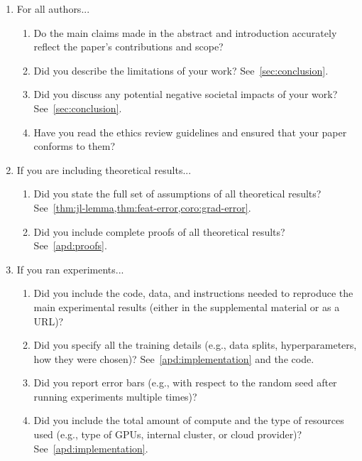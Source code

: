 \documentclass{article}
\begin{document}
\begin{enumerate}

\item For all authors...
\begin{enumerate}
  \item Do the main claims made in the abstract and introduction accurately reflect the paper's contributions and scope?
    \answerYes{}
  \item Did you describe the limitations of your work?
    \answerYes{} See~\cref{sec:conclusion}.
  \item Did you discuss any potential negative societal impacts of your work?
    \answerYes{} See~\cref{sec:conclusion}.
  \item Have you read the ethics review guidelines and ensured that your paper conforms to them?
    \answerYes{}
\end{enumerate}

\item If you are including theoretical results...
\begin{enumerate}
  \item Did you state the full set of assumptions of all theoretical results?
    \answerYes{} See~\cref{thm:jl-lemma,thm:feat-error,coro:grad-error}.
	\item Did you include complete proofs of all theoretical results?
    \answerYes{} See~\cref{apd:proofs}.
\end{enumerate}

\item If you ran experiments...
\begin{enumerate}
  \item Did you include the code, data, and instructions needed to reproduce the main experimental results (either in the supplemental material or as a URL)?
    \answerYes{}
  \item Did you specify all the training details (e.g., data splits, hyperparameters, how they were chosen)?
    \answerYes{} See~\cref{apd:implementation} and the code.
	\item Did you report error bars (e.g., with respect to the random seed after running experiments multiple times)?
    \answerYes{}
	\item Did you include the total amount of compute and the type of resources used (e.g., type of GPUs, internal cluster, or cloud provider)?
    \answerYes{} See~\cref{apd:implementation}.
\end{enumerate}


\end{enumerate}
\end{document}
